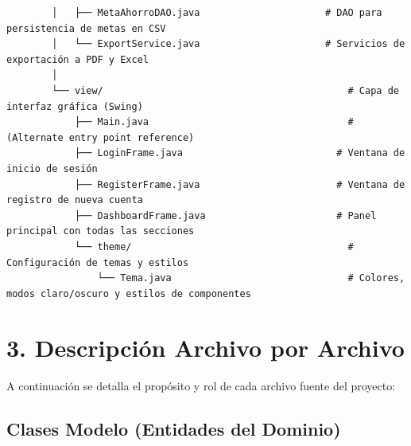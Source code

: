 \documentclass[utf8]{article}
\begin{document}
\begin{verbatim}
        │   ├── MetaAhorroDAO.java                      # DAO para persistencia de metas en CSV
        │   └── ExportService.java                      # Servicios de exportación a PDF y Excel
        │
        └── view/                                           # Capa de interfaz gráfica (Swing)
            ├── Main.java                                   # (Alternate entry point reference)
            ├── LoginFrame.java                           # Ventana de inicio de sesión
            ├── RegisterFrame.java                        # Ventana de registro de nueva cuenta
            ├── DashboardFrame.java                       # Panel principal con todas las secciones
            └── theme/                                      # Configuración de temas y estilos
                └── Tema.java                               # Colores, modos claro/oscuro y estilos de componentes
\end{verbatim}

\section*{3. Descripción Archivo por Archivo}

A continuación se detalla el propósito y rol de cada archivo fuente del proyecto:

\subsection*{Clases Modelo (Entidades del Dominio)}
\end{document}
